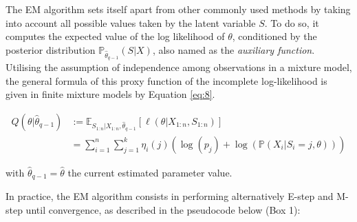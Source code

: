 The EM algorithm sets itself apart from other commonly used methods by taking
into account all possible values taken by the latent variable \(S\). To do
so, it computes the expected value of the log likelihood of \(\theta\),
conditioned by the posterior distribution
\(\mathbb{P}_{\hat{\theta}_{q-1}} (S|X)\), also named as the \emph{auxiliary
function}. Utilising the assumption of independence among observations in a mixture model, the general formula of this proxy
function of the incomplete log-likelihood is given in finite mixture
models by Equation \eqref{eq:8}.

\begin{equation}
\begin{split}
Q(\theta|\hat{\theta}_{q-1}) & := \mathbb{E}_{S_{1:n}| X_{1:n}, \hat{\theta}_{q-1}} \left[\ell(\theta | X_{1:n}, S_{1:n})\right] \\
&=\sum_{i=1}^n \sum_{j=1}^k \eta_{i}(j) \left( \log (p_j) +  \log (\mathbb{P}(X_i|S_i=j, \theta)) \right)
\end{split}
\label{eq:8}
\end{equation}

with \(\hat{\theta}_{q-1}=\hat{\theta}\) the current estimated parameter
value.

In practice, the EM algorithm consists in performing alternatively E-step and M-step until convergence, as described in the pseudocode below (Box 1):

